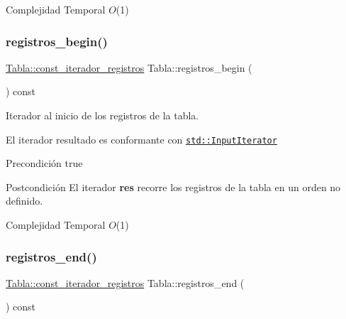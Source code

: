 \begin{DoxyDescription}
\item[Complejidad Temporal]$O$(1)
\end{DoxyDescription}\mbox{\label{classTabla_abbae06c74157e0ddfe66796a78bb2c65}} 
\subsubsection{\texorpdfstring{registros\+\_\+begin()}{registros\_begin()}}
{\footnotesize\ttfamily \mbox{\hyperlink{classTabla_1_1const__iterador__registros}{Tabla\+::const\+\_\+iterador\+\_\+registros}} Tabla\+::registros\+\_\+begin (\begin{DoxyParamCaption}{ }\end{DoxyParamCaption}) const}



Iterador al inicio de los registros de la tabla. 

El iterador resultado es conformante con \href{http://en.cppreference.com/w/cpp/concept/InputIterator}{\tt std\+::\+Input\+Iterator}

\begin{DoxyPrecond}{Precondición}
true 
\end{DoxyPrecond}
\begin{DoxyPostcond}{Postcondición}
El iterador {\bfseries res} recorre los registros de la tabla en un orden no definido.
\end{DoxyPostcond}

\begin{DoxyDescription}
\item[Complejidad Temporal]$O$(1)
\end{DoxyDescription}\mbox{\label{classTabla_a0dbdc0d601d5963f38df24367e373e53}} 
\subsubsection{\texorpdfstring{registros\+\_\+end()}{registros\_end()}}
{\footnotesize\ttfamily \mbox{\hyperlink{classTabla_1_1const__iterador__registros}{Tabla\+::const\+\_\+iterador\+\_\+registros}} Tabla\+::registros\+\_\+end (\begin{DoxyParamCaption}{ }\end{DoxyParamCaption}) const}



